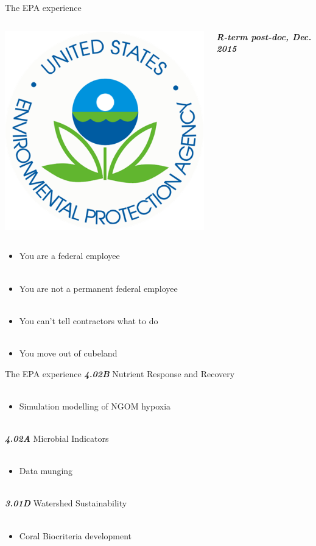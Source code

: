 \documentclass[serif]{beamer}\usepackage[]{graphicx}\usepackage[]{color}
\newcommand{\emtxt}[1]{\textbf{\textit{#1}}}
\begin{document}
\begin{frame}{The EPA experience}{}
\begin{columns}
\begin{column}{0.5\textwidth}
\centerline{\includegraphics[width=0.3\linewidth]{fig/epa_logo.png}}
\end{column}
\begin{column}{0.5\textwidth}
\emtxt{R-term post-doc, Dec. 2015}
\end{column}
\end{columns}
\vspace{0.15in}
\begin{itemize}
\item<+-> You are a federal employee \\~\\
\item<+-> You are not a permanent federal employee \\~\\
\item<+-> You can't tell contractors what to do \\~\\
\item<+-> You move out of cubeland
\end{itemize}
\end{frame}

\begin{frame}{The EPA experience}{}
\emtxt{4.02B} Nutrient Response and Recovery \\~\\
\begin{itemize}
\item Simulation modelling of NGOM hypoxia  \\~\\
\end{itemize}
\emtxt{4.02A} Microbial Indicators  \\~\\
\begin{itemize}
\item Data munging  \\~\\
\end{itemize}
\emtxt{3.01D} Watershed Sustainability  \\~\\
\begin{itemize}
\item Coral Biocriteria development 
\end{itemize}
\end{frame}
\end{document}
